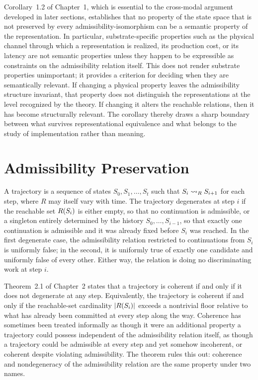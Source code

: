 Corollary~1.2 of Chapter~1, which is essential to the cross-modal argument developed in later sections, establishes that no property of the state space that is not preserved by every admissibility-isomorphism can be a semantic property of the representation. In particular, substrate-specific properties such as the physical channel through which a representation is realized, its production cost, or its latency are not semantic properties unless they happen to be expressible as constraints on the admissibility relation itself. This does not render substrate properties unimportant; it provides a criterion for deciding when they are semantically relevant. If changing a physical property leaves the admissibility structure invariant, that property does not distinguish the representations at the level recognized by the theory. If changing it alters the reachable relations, then it has become structurally relevant. The corollary thereby draws a sharp boundary between what survives representational equivalence and what belongs to the study of implementation rather than meaning.

\section{Admissibility Preservation}

A trajectory is a sequence of states $S_0, S_1, \dots, S_t$ such that $S_i \rightsquigarrow_{R} S_{i+1}$ for each step, where $R$ may itself vary with time. The trajectory degenerates at step $i$ if the reachable set $R(S_i)$ is either empty, so that no continuation is admissible, or a singleton entirely determined by the history $S_0, \dots, S_{i-1}$, so that exactly one continuation is admissible and it was already fixed before $S_i$ was reached. In the first degenerate case, the admissibility relation restricted to continuations from $S_i$ is uniformly false; in the second, it is uniformly true of exactly one candidate and uniformly false of every other. Either way, the relation is doing no discriminating work at step $i$.

Theorem~2.1 of Chapter~2 states that a trajectory is coherent if and only if it does not degenerate at any step. Equivalently, the trajectory is coherent if and only if the reachable-set cardinality $|R(S_i)|$ exceeds a nontrivial floor relative to what has already been committed at every step along the way. Coherence has sometimes been treated informally as though it were an additional property a trajectory could possess independent of the admissibility relation itself, as though a trajectory could be admissible at every step and yet somehow incoherent, or coherent despite violating admissibility. The theorem rules this out: coherence and nondegeneracy of the admissibility relation are the same property under two names.

